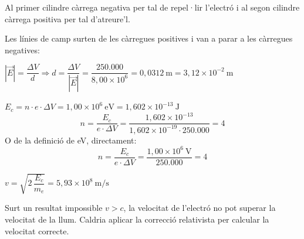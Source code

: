 \begin{solapartat}
 Al primer cilindre càrrega negativa per tal de repel·lir l'electró i al segon cilindre càrrega positiva per tal d'atreure'l.

 Les línies de camp surten de les càrregues positives i van a parar a les càrregues negatives:

 $|\vec{E}| = \dfrac{\Delta V}{d} \Rightarrow d = \dfrac{\Delta V}{|\vec{E}|} = \dfrac{250.000}{8,00\times 10^{6}} = 0,0312\ \mathrm{m} = 3,12\times 10^{-2}\ \mathrm{m}$ \quad {}
\end{solapartat}

\begin{solapartat}
 $E_c = n\cdot e\cdot\Delta V = 1,00\times 10^{6}\ \mathrm{eV} = 1,602\times 10^{-13}\ \mathrm{J}$
\[ n = \frac{E_c}{e\cdot\Delta V} = \frac{1,602\times 10^{-13}}{1,602\times 10^{-19}\cdot 250.000} = 4 \]
O de la definició de eV, directament:
\[ n = \frac{E_c}{e\cdot\Delta V} = \frac{1,00\times 10^{6}\ \mathrm{V}}{250.000} = 4 \]

 $v = \sqrt{2\,\dfrac{E_c}{m_e}} = 5,93\times 10^{8}\ \mathrm{m/s}$

 Surt un resultat impossible $v > c$, la velocitat de l'electró no pot superar la velocitat de la llum. Caldria aplicar la correcció relativista per calcular la velocitat correcte.
\end{solapartat}
